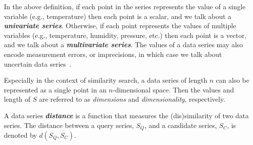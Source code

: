 In the above definition, if each point in the series represents the value of a single variable (e.g., temperature) then each point is a scalar, and we talk about a \textit{\textbf{univariate series}}. Otherwise, if each point represents the values of multiple variables (e.g., temperature, humidity, pressure, etc.) then each point is a vector, and we talk about a \textit{\textbf{multivariate series}}.
The values of a data series may also encode measurement errors, or imprecisions, in which case we talk about uncertain data series~\cite{DBLP:conf/ssdbm/AssfalgKKR09,DBLP:conf/edbt/YehWYC09,DBLP:conf/kdd/SarangiM10,DBLP:journals/pvldb/DallachiesaNMP12,journal/vldb/Dallachiesa2014}.

Especially in the context of similarity search, a data series of length $n$ can also be represented as a single point in an $n$-dimensional space. %
Then the values and length of $S$ are referred to as \emph{dimensions} and \emph{dimensionality}, respectively.

%



A data series \textit{\textbf{distance}} is a function that measures the (dis)similarity of two data series.
The distance between a query series, $S_Q$, and a candidate series, $S_C$, is denoted by $d(S_Q,S_C)$.

